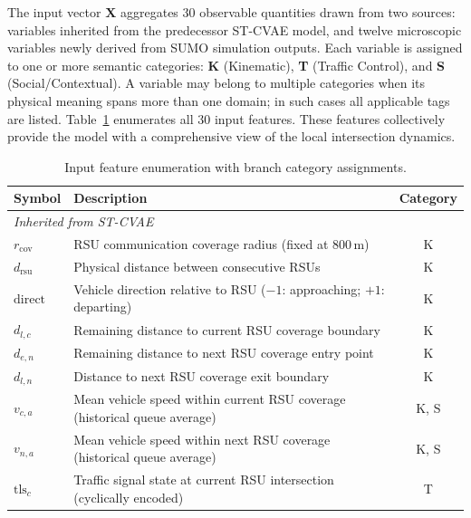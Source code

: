 \documentclass[journal]{IEEEtran}
\begin{document}

The input vector $\mathbf{X}$ aggregates 30 observable quantities drawn from
two sources: variables inherited from the predecessor ST-CVAE model, and
twelve microscopic variables newly derived from SUMO simulation outputs.
Each variable is assigned to one or more semantic categories:
\textbf{K} (Kinematic), \textbf{T} (Traffic Control), and
\textbf{S} (Social/Contextual).
A variable may belong to multiple categories when its physical meaning spans
more than one domain; in such cases all applicable tags are listed.
Table~\ref{tab:features} enumerates all 30 input features.
These features collectively provide the model with a comprehensive view of the local intersection dynamics.

\begin{table}[!t]
  \renewcommand{\arraystretch}{1.1}
  \caption{Input feature enumeration with branch category assignments.}
  \label{tab:features}
  \centering
  \begin{tabular}{@{}lp{5.0cm}c@{}}
    \toprule
    \textbf{Symbol} & \textbf{Description} & \textbf{Category} \\
    \midrule
    \multicolumn{3}{l}{\textit{Inherited from ST-CVAE}} \\
    $r_{\text{cov}}$          & RSU communication coverage radius (fixed at 800\,m)                         & K \\
    $d_{\text{rsu}}$          & Physical distance between consecutive RSUs                                   & K \\
    $\text{direct}$           & Vehicle direction relative to RSU ($-1$: approaching; $+1$: departing)      & K \\
    $d_{l,c}$                 & Remaining distance to current RSU coverage boundary                          & K \\
    $d_{e,n}$                 & Remaining distance to next RSU coverage entry point                          & K \\
    $d_{l,n}$                 & Distance to next RSU coverage exit boundary                                  & K \\
    $v_{c,a}$                 & Mean vehicle speed within current RSU coverage (historical queue average)    & K, S \\
    $v_{n,a}$                 & Mean vehicle speed within next RSU coverage (historical queue average)       & K, S \\
    $\text{tls}_{c}$          & Traffic signal state at current RSU intersection (cyclically encoded)        & T \\

\end{tabular}
\end{table}
\end{document}
